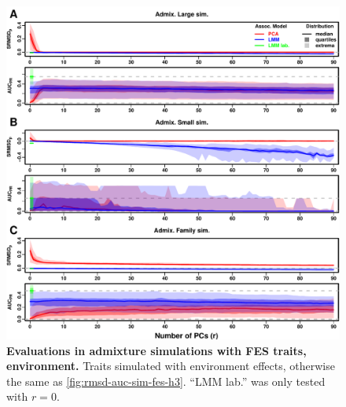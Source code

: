 \documentclass[11pt]{article}
\begin{document}
\begin{figure}[hp!]
  \centering
  \includegraphics[width=\textwidth,height=\textheight,keepaspectratio]{fes/m_causal_fac-27/h0.3/env0.3-0.2/rmsd-auc-sim.pdf}
  \caption{
    {\bf Evaluations in admixture simulations with FES traits, environment.}
    Traits simulated with environment effects, otherwise the same as \cref{fig:rmsd-auc-sim-fes-h3}.
    ``LMM lab.'' was only tested with $r=0$.
  }
  \label{fig:rmsd-auc-sim-fes-env}
\end{figure}
\end{document}
